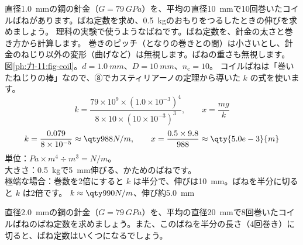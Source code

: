 \begin{phreidai}[コイルばねのばね定数]
\label{ph:力-11:ex12}直径\qty{1.0}{mm}の鋼の針金（$G=\qty{79}{GPa}$）を、平均の直径\qty{10}{mm}で10回巻いたコイルばねがあります。ばね定数を求め、\qty{0.5}{kg}のおもりをつるしたときの伸びを求めましょう。
\phbamen
理科の実験で使うようなばねです。ばね定数を、針金の太さと巻き方から計算します。
\phmushi
巻きのピッチ（となりの巻きとの間）は小さいとし、針金のねじり以外の変形（曲げなど）は無視します。ばねの重さも無視します。
\phzu
図\ref{ph:力-11:fig-coil}。$d=\qty{1.0}{mm}$、$D=\qty{10}{mm}$、$n_{\mathrm c}=10$。
\phriyu
コイルばねは「巻いたねじりの棒」なので、⑧でカスティリアーノの定理から導いた $k$ の式を使います。
\phtateru
\[ k=\frac{79\times10^9\times(1.0\times10^{-3})^4}{8\times10\times(10\times10^{-3})^3},\qquad x=\frac{mg}{k} \]
\phtoku
\[ k=\frac{0.079}{8\times10^{-5}}\approx\pxlq{988}{N/m},\qquad x=\frac{0.5\times9.8}{988}\approx\qty{5.0e-3}{m} \]
\phtashikame
単位：$\unit{Pa}\times\unit{m^4}\div\unit{m^3}=\unit{N/m}$。\\
大きさ：\qty{0.5}{kg}で\qty{5}{mm}伸びる、かためのばねです。\\
極端な場合：巻数を2倍にすると $k$ は半分で、伸びは\qty{10}{mm}。ばねを半分に切ると $k$ は2倍です。
\kotae $k\approx\pxlq{990}{N/m}$、伸び約\qty{5.0}{mm}
\end{phreidai}
\begin{jibun}
直径\qty{2.0}{mm}の鋼の針金（$G=\qty{79}{GPa}$）を、平均の直径\qty{20}{mm}で8回巻いたコイルばねのばね定数を求めましょう。また、このばねを半分の長さ（4回巻き）に切ると、ばね定数はいくつになるでしょう。
\end{jibun}

